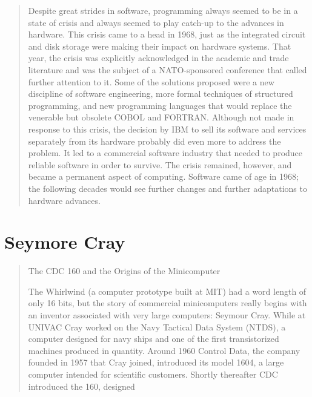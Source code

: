 \begin{quotation}
Despite great strides in software, programming always seemed to be in a state 
of crisis and always seemed to play catch-up to the advances in hardware. This 
crisis came to a head in 1968, just as the integrated circuit and disk storage 
were making their impact on hardware systems. That year, the crisis was 
explicitly acknowledged in the academic and trade literature and was the 
subject of a NATO-sponsored conference that called further attention to it. 
Some of the solutions proposed were a new discipline of software engineering, 
more formal techniques of structured programming, and new programming languages 
that would replace the venerable but obsolete COBOL and FORTRAN. Although not 
made in response to this crisis, the decision by IBM to sell its software and 
services separately from its hardware probably did even more to address the 
problem. It led to a commercial software industry that needed to produce 
reliable software in order to survive. The crisis remained, however, and became 
a permanent aspect of computing. Software came of age in 1968; the following 
decades would see further changes and further adaptations to hardware advances.
\end{quotation}


\section{Seymore Cray}

\begin{quotation}
The CDC 160 and the Origins of the Minicomputer

The Whirlwind (a computer prototype built at MIT) had a word length of only 16 bits, but the story of
commercial minicomputers really begins with an inventor associated with very large computers: Seymour
Cray. While at UNIVAC Cray worked on the Navy Tactical Data System (NTDS), a computer designed for
navy ships and one of the first transistorized machines produced in quantity. Around 1960 Control Data, the
company founded in 1957 that Cray joined, introduced its model 1604, a large computer intended for
scientific customers. Shortly thereafter CDC introduced the 160, designed
\cite{nothing_new_since_von_neumann_2000}
\end{quotation}

